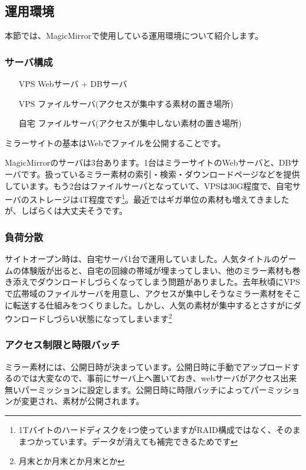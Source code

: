 
\subsection{運用環境}
本節では、MagicMirrorで使用している運用環境について紹介します。

\subsubsection{サーバ構成}

\begin{itemize}
 \item [VPS] Webサーバ + DBサーバ 
 \item [VPS] ファイルサーバ(アクセスが集中する素材の置き場所)
 \item [自宅] ファイルサーバ(アクセスが集中しない素材の置き場所)
\end{itemize}

ミラーサイトの基本はWebでファイルを公開することです。

MagicMirrorのサーバは3台あります。1台はミラーサイトのWebサーバと、DBサーバです。扱っているミラー素材の索引・検索・ダウンロードページなどを提供しています。もう2台はファイルサーバとなっていて、VPSは30G程度で、自宅サーバのストレージは4T程度です\footnote{1Tバイトのハードディスクを4つ使っていますがRAID構成ではなく、そのままつかっています。データが消えても補完できるためです}。最近ではギガ単位の素材も増えてきましたが、しばらくは大丈夫そうです。

\subsubsection{負荷分散}
サイトオープン時は、自宅サーバ1台で運用していました。人気タイトルのゲームの体験版が出ると、自宅の回線の帯域が埋まってしまい、他のミラー素材も巻き添えでダウンロードしづらくなってしまう問題がありました。去年秋頃にVPSで広帯域のファイルサーバを用意し、アクセスが集中しそうなミラー素材をそこに転送する仕組みをつくりました。しかし、人気の素材が集中するとさすがにダウンロードしづらい状態になってしまいます\footnote{月末とか月末とか月末とか}

\subsubsection{アクセス制限と時限バッチ}
ミラー素材には、公開日時が決まっています。公開日時に手動でアップロードするのでは大変なので、事前にサーバ上へ置いておき、webサーバがアクセス出来無いパーミッションに設定します。公開日時に時限バッチによってパーミッションが変更され、素材が公開されます。


